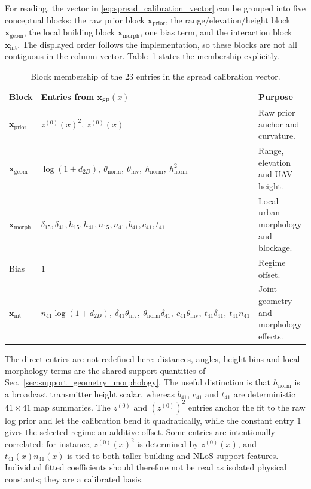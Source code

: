 For reading, the vector in \eqref{eq:spread_calibration_vector} can be grouped into five conceptual blocks:
the raw prior block \(\textbf{x}_{\mathrm{prior}}\), the
range/elevation/height block \(\textbf{x}_{\mathrm{geom}}\), the local building
block \(\textbf{x}_{\mathrm{morph}}\), one bias term, and the interaction block
\(\textbf{x}_{\mathrm{int}}\). The displayed order follows the implementation,
so these blocks are not all contiguous in the column vector. Table~\ref{tab:spread_vector_blocks}
states the membership explicitly.

\begin{table}[H]
\centering
\caption{Block membership of the 23 entries in the spread calibration vector.}
\label{tab:spread_vector_blocks}
\scriptsize
\setlength{\tabcolsep}{3pt}
\renewcommand{\arraystretch}{1.05}
\begin{tabularx}{\textwidth}{p{2.75cm} X p{2.55cm}}
\toprule
\textbf{Block} & \textbf{Entries from \(\textbf{x}_{\mathrm{SP}}(x)\)} & \textbf{Purpose} \\
\midrule
\(\textbf{x}_{\mathrm{prior}}\) &
\(z^{(0)}(x)^2,\ z^{(0)}(x)\) &
Raw prior anchor and curvature. \\
\(\textbf{x}_{\mathrm{geom}}\) &
\(\log(1+d_{2D}),\ \theta_{\mathrm{norm}},\ \theta_{\mathrm{inv}},\ h_{\mathrm{norm}},\ h_{\mathrm{norm}}^2\) &
Range, elevation and UAV height. \\
\(\textbf{x}_{\mathrm{morph}}\) &
\(\delta_{15},\delta_{41},h_{15},h_{41},n_{15},n_{41},b_{41},c_{41},t_{41}\) &
Local urban morphology and blockage. \\
Bias &
\(1\) &
Regime offset. \\
\(\textbf{x}_{\mathrm{int}}\) &
\(n_{41}\log(1+d_{2D}),\ \delta_{41}\theta_{\mathrm{inv}},\ \theta_{\mathrm{norm}}\delta_{41},\ c_{41}\theta_{\mathrm{inv}},\ t_{41}\delta_{41},\ t_{41}n_{41}\) &
Joint geometry and morphology effects. \\
\bottomrule
\end{tabularx}
\end{table}

The direct entries are not redefined here: distances, angles, height bins and
local morphology terms are the shared support quantities of
Sec.~\ref{sec:support_geometry_morphology}. The useful distinction is that
\(h_{\mathrm{norm}}\) is a broadcast transmitter height scalar, whereas
\(b_{41}\), \(c_{41}\) and \(t_{41}\) are deterministic \(41\times41\)
map summaries. The \(z^{(0)}\) and \(\left(z^{(0)}\right)^2\) entries anchor the fit to the
raw log prior and let the calibration bend it quadratically, while the constant
entry \(1\) gives the selected regime an additive offset. Some entries are
intentionally correlated: for instance,
\(z^{(0)}(x)^2\) is determined by \(z^{(0)}(x)\), and
\(t_{41}(x)n_{41}(x)\) is tied to both taller building and NLoS support
features. Individual fitted coefficients should therefore not be read as
isolated physical constants; they are a calibrated basis.

